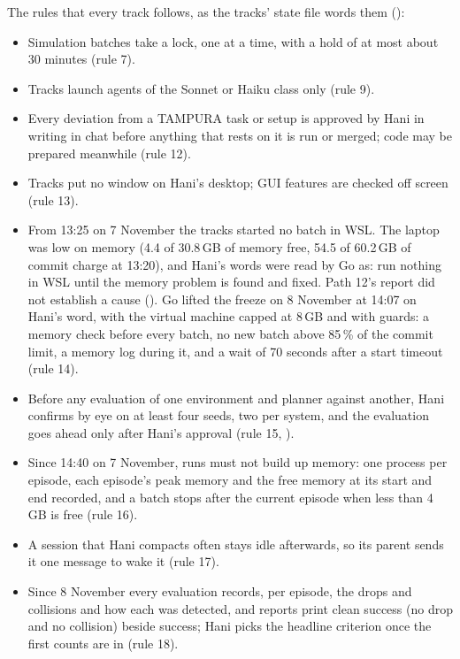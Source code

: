 The rules that every track follows, as the tracks' state file words them
():
\begin{itemize}
  \item Simulation batches take a lock, one at a time, with a hold of at most
  about 30 minutes (rule 7).
  \item Tracks launch agents of the Sonnet or Haiku class only (rule 9).
  \item Every deviation from a TAMPURA task or setup is approved by Hani in writing
  in chat before anything that rests on it is run or merged; code may be prepared
  meanwhile (rule 12).
  \item Tracks put no window on Hani's desktop; GUI features are checked off screen
  (rule 13).
  \item From 13:25 on 7 November the tracks started no batch in WSL. The laptop was low on memory
  (4.4 of 30.8\,GB of memory free, 54.5 of 60.2\,GB of commit charge at 13:20), and
  Hani's words were read by Go as: run nothing in WSL until the memory problem is
  found and fixed. Path 12's report did not establish a cause (). Go lifted
  the freeze on 8 November at 14:07 on Hani's word, with the virtual machine capped
  at 8\,GB and with guards: a memory check before every batch, no new batch above
  85\,\% of the commit limit, a memory log during it, and a wait of 70 seconds after a
  start timeout (rule 14).
  \item Before any evaluation of one environment and planner against another, Hani
  confirms by eye on at least four seeds, two per system, and the evaluation goes
  ahead only after Hani's approval (rule 15, ).
  \item Since 14:40 on 7 November, runs must not build up memory: one process per
  episode, each episode's peak memory and the free memory at its start and end
  recorded, and a batch stops after the current episode when less than 4\,GB is free
  (rule 16).
  \item A session that Hani compacts often stays idle afterwards, so its parent sends
  it one message to wake it (rule 17).
  \item Since 8 November every evaluation records, per episode, the drops and collisions
  and how each was detected, and reports print clean success (no drop and no collision)
  beside success; Hani picks the headline criterion once the first counts are in
  (rule 18).
\end{itemize}

